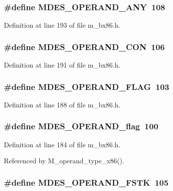 \subsubsection{\setlength{\rightskip}{0pt plus 5cm}\#define MDES\_\-OPERAND\_\-ANY~108}\label{m__bx86_8h_d1d05f6a4132d5ca383ae942d9b69ec2}




Definition at line 193 of file m\_\-bx86.h.
\subsubsection{\setlength{\rightskip}{0pt plus 5cm}\#define MDES\_\-OPERAND\_\-CON~106}\label{m__bx86_8h_9b63342547a5a75a2cb96a1111dc99ee}




Definition at line 191 of file m\_\-bx86.h.
\subsubsection{\setlength{\rightskip}{0pt plus 5cm}\#define MDES\_\-OPERAND\_\-FLAG~103}\label{m__bx86_8h_7462d89e1e99aff21fe6c2e2d06db7c0}




Definition at line 188 of file m\_\-bx86.h.
\subsubsection{\setlength{\rightskip}{0pt plus 5cm}\#define MDES\_\-OPERAND\_\-flag~100}\label{m__bx86_8h_302e290b4a3442996e388f4c8bf18f18}




Definition at line 184 of file m\_\-bx86.h.

Referenced by M\_\-operand\_\-type\_\-x86().
\subsubsection{\setlength{\rightskip}{0pt plus 5cm}\#define MDES\_\-OPERAND\_\-FSTK~105}\label{m__bx86_8h_2dc11e73687a82435df30c5893a73cd0}




